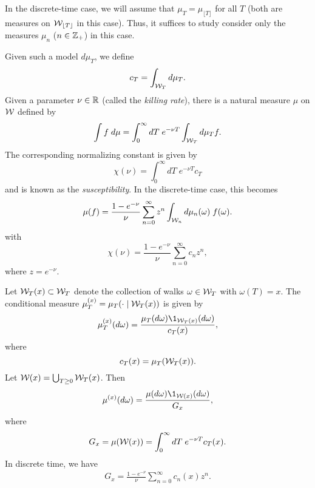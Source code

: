 In the discrete-time case, we will assume that
$\mu_T = \mu_{\lfloor T \rfloor}$ for all $T$ (both are measures on
$\mathcal{W}_{\lfloor T \rfloor}$ in this case). Thus, it suffices to study consider only
the measures $\mu_n$ ($n \in {\mathbb Z}_+$) in this case.

Given such a model $d\mu_T$, we define
\begin{equation}
c_T = \int_{\mathcal{W}_T} d\mu_T.
\end{equation}
Given a parameter $\nu \in {\mathbb R}$ (called the \emph{killing rate}),
there is a natural measure $\mu$ on $\mathcal{W}$ defined by
\begin{equation}
\int f \; d\mu
  =
\int_0^\infty dT \; e^{-\nu T} \int_{\mathcal{W}_T} d\mu_T f.
\end{equation}
The corresponding normalizing constant is given by
\begin{equation}
\chi(\nu) = \int_0^\infty dT \; e^{-\nu T} c_T
\end{equation}
and is known as the \emph{susceptibility}. In the discrete-time case, this becomes
\begin{equation}
\mu(f)
  =
\frac{1 - e^{-\nu}}{\nu} \sum_{n=0}^\infty z^n \int_{\mathcal{W}_n} d\mu_n(\omega) \; f(\omega).
\end{equation}
with
\begin{equation}
\chi(\nu) = \frac{1 - e^{-\nu}}{\nu} \sum_{n=0}^\infty c_n z^n,
\end{equation}
where $z = e^{-\nu}$.

Let $\mathcal{W}_T(x) \subset \mathcal{W}_T$ denote the collection of walks $\omega \in \mathcal{W}_T$
with $\omega(T) = x$. The conditional measure $\mu^{(x)}_T = \mu_T(\cdot \mid \mathcal{W}_T(x))$
is given by
\begin{equation}
\mu^{(x)}_T(d\omega) = \frac{\mu_T(d\omega) \1_{\Wcal_T(x)}(d\omega)}{c_T(x)},
\end{equation}
where
\begin{equation}
c_T(x) = \mu_T(\mathcal{W}_T(x)).
\end{equation}
Let $\mathcal{W}(x) = \bigcup_{T \ge 0} \mathcal{W}_T(x)$. Then
\begin{equation}
\mu^{(x)}(d\omega) = \frac{\mu(d\omega) \1_{\Wcal(x)}(d\omega)}{G_x},
\end{equation}
where
\begin{equation}
G_x = \mu(\mathcal{W}(x)) = \int_0^\infty dT \; e^{-\nu T} c_T(x).
\end{equation}
In discrete time, we have
\begin{align}
G_x = \frac{1 - e^{-\nu}}{\nu} \sum_{n=0}^\infty c_n(x) z^n.
\end{align}

